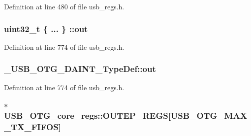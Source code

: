 Definition at line 480 of file usb\-\_\-regs.\-h.

\hypertarget{group___u_s_b___o_t_g___d_r_i_v_e_r_gadfa3341a8c981f1282a8d0a0a8384f70}{
\subsubsection[{out}]{\setlength{\rightskip}{0pt plus 5cm}uint32\-\_\-t \{ ... \} \-::out}}\label{group___u_s_b___o_t_g___d_r_i_v_e_r_gadfa3341a8c981f1282a8d0a0a8384f70}


Definition at line 774 of file usb\-\_\-regs.\-h.

\hypertarget{group___u_s_b___o_t_g___d_r_i_v_e_r_ga60a84be2a00058a3ed7c410e909322af}{
\subsubsection[{out}]{ \-\_\-\-U\-S\-B\-\_\-\-O\-T\-G\-\_\-\-D\-A\-I\-N\-T\-\_\-\-Type\-Def\-::out}}\label{group___u_s_b___o_t_g___d_r_i_v_e_r_ga60a84be2a00058a3ed7c410e909322af}


Definition at line 774 of file usb\-\_\-regs.\-h.

\hypertarget{group___u_s_b___o_t_g___d_r_i_v_e_r_ga260fda7483480de26837c4ed6740e136}{
\subsubsection[{O\-U\-T\-E\-P\-\_\-\-R\-E\-G\-S}]{$\ast$ U\-S\-B\-\_\-\-O\-T\-G\-\_\-core\-\_\-regs\-::\-O\-U\-T\-E\-P\-\_\-\-R\-E\-G\-S\mbox{[}U\-S\-B\-\_\-\-O\-T\-G\-\_\-\-M\-A\-X\-\_\-\-T\-X\-\_\-\-F\-I\-F\-O\-S\mbox{]}}}\label{group___u_s_b___o_t_g___d_r_i_v_e_r_ga260fda7483480de26837c4ed6740e136}


